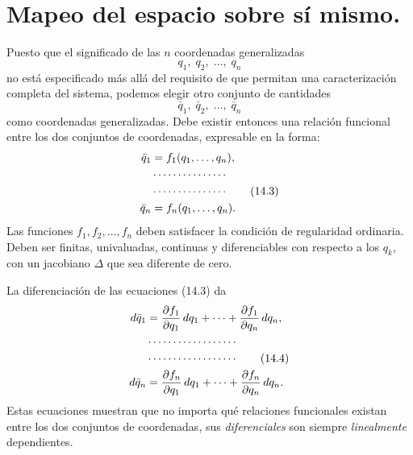 \documentclass[12pt,a4paper]{book}
\begin{document}
\begin{center}
\end{center}


\section{Mapeo del espacio sobre s\'i mismo.}

Puesto que el significado de las $n$ coordenadas generalizadas
\begin{equation}
q_1,\; q_2,\; \ldots,\; q_n
\tag{14.1}
\end{equation}
no est\'a especificado m\'as all\'a del requisito de que permitan una caracterizaci\'on completa del sistema, podemos elegir otro conjunto de cantidades
\begin{equation}
\bar{q}_1,\; \bar{q}_2,\; \ldots,\; \bar{q}_n
\tag{14.2}
\end{equation}
como coordenadas generalizadas. Debe existir entonces una relaci\'on funcional entre los dos conjuntos de coordenadas, expresable en la forma:
\begin{align}
\bar{q}_1 &= f_1(q_1, \ldots, q_n), \notag\\
&\cdots\cdots\cdots\cdots\cdots \notag\\
&\cdots\cdots\cdots\cdots\cdots \tag{14.3}\\
\bar{q}_n &= f_n(q_1, \ldots, q_n). \notag
\end{align}
Las funciones $f_1, f_2, \ldots, f_n$ deben satisfacer la condici\'on de regularidad ordinaria. Deben ser finitas, univaluadas, continuas y diferenciables con respecto a los $q_k$, con un jacobiano $\Delta$ que sea diferente de cero.

La diferenciaci\'on de las ecuaciones (14.3) da
\begin{align}
d\bar{q}_1 &= \frac{\partial f_1}{\partial q_1}\,dq_1 + \cdots + \frac{\partial f_1}{\partial q_n}\,dq_n, \notag\\
&\cdots\cdots\cdots\cdots\cdots\cdots \notag\\
&\cdots\cdots\cdots\cdots\cdots\cdots \tag{14.4}\\
d\bar{q}_n &= \frac{\partial f_n}{\partial q_1}\,dq_1 + \cdots + \frac{\partial f_n}{\partial q_n}\,dq_n. \notag
\end{align}
Estas ecuaciones muestran que no importa qu\'e relaciones funcionales existan entre los dos conjuntos de coordenadas, sus \textit{diferenciales} son siempre \textit{linealmente} dependientes.
\end{document}

